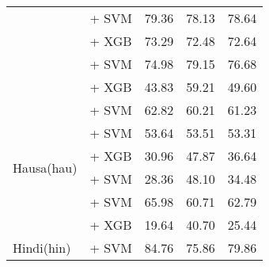 \begin{longtable}{p{4cm}p{6cm}ccc}
                                          & \citep{sturua2024jinaembeddingsv3multilingualembeddingstask} + SVM     & 79.36                                & 78.13              & 78.64             \\
                                          & \citep{sturua2024jinaembeddingsv3multilingualembeddingstask} + XGB     & 73.29                                & 72.48              & 72.64             \\
                                          & \citep{romero2023multilinguale5largeftstsspanish} + SVM                & 74.98                                & 79.15              & 76.68             \\
                                          & \citep{all-MiniLM-L12-v2} + XGB                                        & 43.83                                & 59.21              & 49.60             \\
    \midrule
    \multirow{6}{*}{Hausa(hau)}           & \citep{wang2024multilingual}  + SVM                                    & 62.82                                & 60.21              & 61.23             \\
                                          & \citep{sturua2024jinaembeddingsv3multilingualembeddingstask} + SVM     & 53.64                                & 53.51              & 53.31             \\
                                          & \citep{sturua2024jinaembeddingsv3multilingualembeddingstask} + XGB     & 30.96                                & 47.87              & 36.64             \\
                                          & \citep{oketunji2024pmmlv2finetunedhausa} + SVM                         & 28.36                                & 48.10              & 34.48             \\
                                          & \citep{dobler-demelo-2023-focus} + SVM                                 & 65.98                                & 60.71              & 62.79             \\
                                          & \citep{all-MiniLM-L12-v2} + XGB                                        & 19.64                                & 40.70              & 25.44             \\
    \midrule
    \multirow{7}{*}{Hindi(hin)}           & \citep{sukhlecha_2024_bhasha_embed_v0} + SVM                           & 84.76                                & 75.86              & 79.86             \\

\end{longtable}

